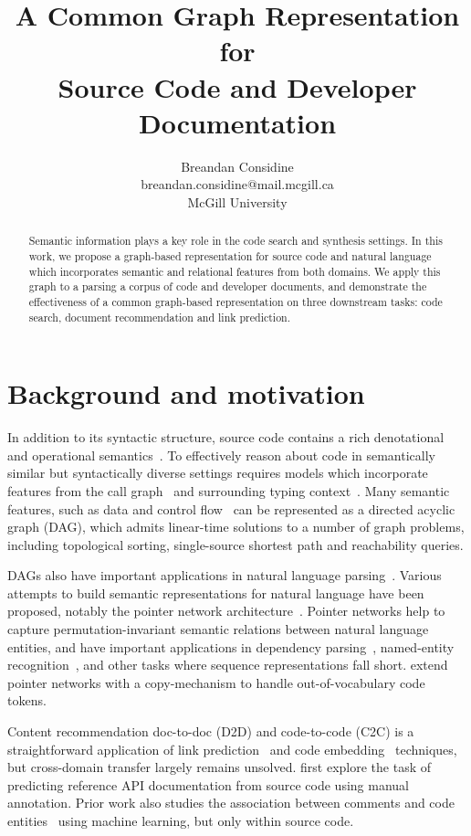 \documentclass{article}
\title{A Common Graph Representation for\\Source Code and Developer Documentation}
\author{Breandan Considine\\
breandan.considine@mail.mcgill.ca\\
McGill University}
\begin{document}
\maketitle

\begin{abstract}
Semantic information plays a key role in the code search and synthesis settings. In this work, we propose a graph-based representation for source code and natural language which incorporates semantic and relational features from both domains. We apply this graph to a parsing a corpus of code and developer documents, and demonstrate the effectiveness of a common graph-based representation on three downstream tasks: code search, document recommendation and link prediction.
\end{abstract}

\section{Background and motivation}

In addition to its syntactic structure, source code contains a rich denotational and operational semantics~\citep{henkel2018code}. To effectively reason about code in semantically similar but syntactically diverse settings requires models which incorporate features from the call graph~\citep{gu2016deep, 10.1145/3361242.3362774} and surrounding typing context~\citep{allamanis2017learning}. Many semantic features, such as data and control flow~\citep{si2018learning} can be represented as a directed acyclic graph (DAG), which admits linear-time solutions to a number of graph problems, including topological sorting, single-source shortest path and reachability queries.

DAGs also have important applications in natural language parsing~\citep{sagae2008shift, quernheim2012dagger}. Various attempts to build semantic representations for natural language have been proposed, notably the pointer network architecture~\citep{vinyals2015pointer, vinyals2015order}. Pointer networks help to capture permutation-invariant semantic relations between natural language entities, and have important applications in dependency parsing~\citep{ma2018stack}, named-entity recognition~\citep{lample2016neural}, and other tasks where sequence representations fall short. \citet{li2017code} extend pointer networks with a copy-mechanism to handle out-of-vocabulary code tokens.

Content recommendation doc-to-doc (D2D) and code-to-code (C2C) is a straightforward application of link prediction~\citep{zhang2018link} and code embedding~\citep{gu2018deep} techniques, but cross-domain transfer largely remains unsolved. \citet{robillard2015recommending} first explore the task of predicting reference API documentation from source code using manual annotation. Prior work also studies the association between comments and code entities~\citep{panthaplackel2020associating} using machine learning, but only within source code.
\end{document}
